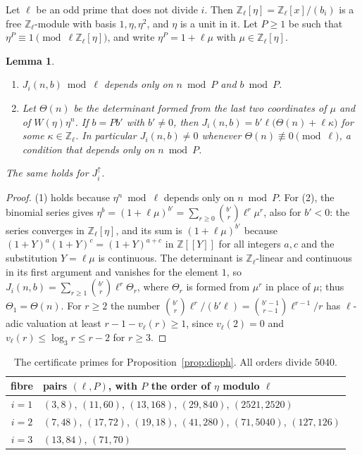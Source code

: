 \documentclass[11pt]{amsart}
\newtheorem{lemma}[theorem]{Lemma}
\theoremstyle{definition}
\newcommand{\Z}{\mathbb{Z}}
\begin{document}
Let $\ell$ be an odd prime that does not divide $i$. Then $\Z_\ell[\eta]=\Z_\ell[x]/(b_i)$ is a free $\Z_\ell$-module with basis $1,\eta,\eta^2$, and $\eta$ is a unit in it. Let $P\ge1$ be such that $\eta^P\equiv1\pmod{\ell\Z_\ell[\eta]}$, and write $\eta^P=1+\ell\mu$ with $\mu\in\Z_\ell[\eta]$.

\begin{lemma}\label{lem:padic}
\begin{enumerate}
\item $J_i(n,b)\bmod\ell$ depends only on $n\bmod P$ and $b\bmod P$.
\item Let $\Theta(n)$ be the determinant formed from the last two coordinates of $\mu$ and of $W(\eta)\eta^n$. If $b=Pb'$ with $b'\ne0$, then $J_i(n,b)=b'\ell\bigl(\Theta(n)+\ell\kappa\bigr)$ for some $\kappa\in\Z_\ell$. In particular $J_i(n,b)\ne0$ whenever $\Theta(n)\not\equiv0\pmod\ell$, a condition that depends only on $n\bmod P$.
\end{enumerate}
The same holds for $J^{\uparrow}_i$.
\end{lemma}

\begin{proof}
(1) holds because $\eta^n\bmod\ell$ depends only on $n\bmod P$. For (2), the binomial series gives $\eta^b=(1+\ell\mu)^{b'}=\sum_{r\ge0}\binom{b'}{r}\ell^r\mu^r$, also for $b'<0$: the series converges in $\Z_\ell[\eta]$, and its sum is $(1+\ell\mu)^{b'}$ because $(1+Y)^{a}(1+Y)^{c}=(1+Y)^{a+c}$ in $\Z[[Y]]$ for all integers $a,c$ and the substitution $Y=\ell\mu$ is continuous. The determinant is $\Z_\ell$-linear and continuous in its first argument and vanishes for the element $1$, so $J_i(n,b)=\sum_{r\ge1}\binom{b'}{r}\ell^r\Theta_r$, where $\Theta_r$ is formed from $\mu^r$ in place of $\mu$; thus $\Theta_1=\Theta(n)$. For $r\ge2$ the number $\binom{b'}{r}\ell^{r}/(b'\ell)=\binom{b'-1}{r-1}\ell^{r-1}/r$ has $\ell$-adic valuation at least $r-1-v_\ell(r)\ge1$, since $v_\ell(2)=0$ and $v_\ell(r)\le\log_3r\le r-2$ for $r\ge3$.
\end{proof}

\begin{table}[ht]
\centering
\begin{tabular}{cl}
\toprule
fibre & pairs $(\ell,P)$, with $P$ the order of $\eta$ modulo $\ell$\\
\midrule
$i=1$ & $(3,8)$, $(11,60)$, $(13,168)$, $(29,840)$, $(2521,2520)$\\
$i=2$ & $(7,48)$, $(17,72)$, $(19,18)$, $(41,280)$, $(71,5040)$, $(127,126)$\\
$i=3$ & $(13,84)$, $(71,70)$\\
\bottomrule
\end{tabular}
\caption{The certificate primes for Proposition~\ref{prop:dioph}. All orders divide $5040$.}\label{tab:cert}
\end{table}
\end{document}
